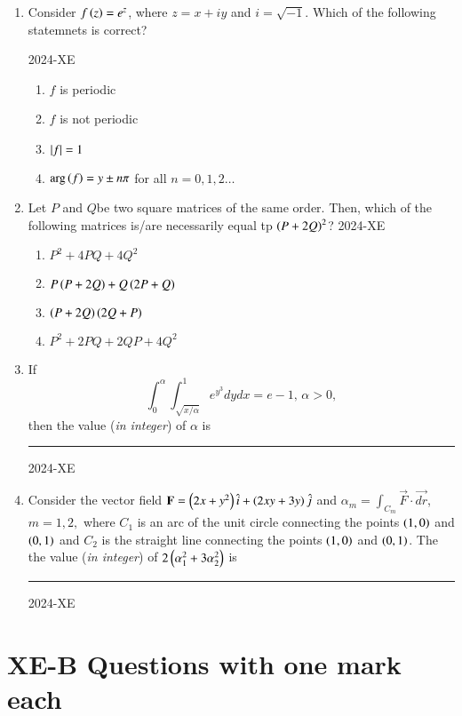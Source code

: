 \documentclass[journal,12pt,onecolumn]{IEEEtran}
\theoremstyle{remark}
\begin{document}
\begin{enumerate}

	\item Consider $f\left(z\right)=e^z$, where $z=x+iy$ and $i=\sqrt{-1}$. Which of the following statemnets is correct?

	 \hfill{2024-XE}

		\begin{enumerate}
			\item $f$ is periodic
			\item $f$ is not periodic
			\item $\left\vert f\right\vert=1$
			\item $\text{arg}\left(f\right)=y \pm n \pi$ for all $n=0,1,2 \ldots$
		\end{enumerate}

	\item Let $P$ and $Q$be two square matrices of the same order. Then, which of the following matrices is/are necessarily equal tp $\left(P+2Q\right)^2$?
	\hfill{2024-XE}

		\begin{enumerate}
			\item $P^2 +4PQ +4Q^2$
			\item $P\left(P+2Q\right)+Q\left(2P+Q\right)$
			\item $\left(P+2Q\right) \left(2Q+P\right)$
			\item $P^2 +2PQ+2QP+4Q^2$
		\end{enumerate}

	\item If 
		$$ \int _0 ^{\alpha} \int_{\sqrt{x/{\alpha}}} ^1 e^{y^3}dydx=e-1, \, \alpha>0,$$
		then the value (\textit{in integer}) of $\alpha$ is \rule{1cm}{0.2pt}
	\hfill{2024-XE}

	
	\item Consider the vector field $\mathbf{F}=\left(2x+y^2\right)\hat{i} + \left(2xy+3y\right)\hat{j}$ and $\alpha_m =\int _{C_m} \vec{F} \cdot \vec{dr}$, $m=1,2,$ where $C_1$ is an arc of the unit circle connecting the points $\left(1,0\right)$ and $\left(0,1\right)$ and $C_2$ is the straight line connecting the points $\left(1,0\right)$ and $\left(0,1\right)$. The the value (\textit{in integer}) of $2\left(\alpha_1 ^2 +3\alpha_2 ^2\right)$ is \rule{1cm}{0.2pt}
	\hfill{2024-XE}


\end{enumerate}

\section{XE-B Questions with one mark each}
\end{document}
